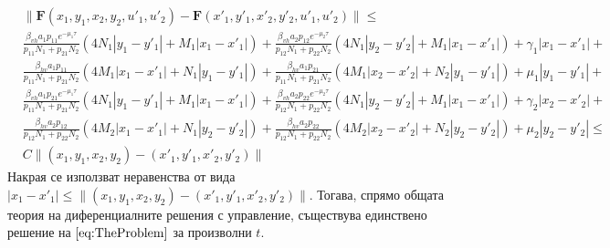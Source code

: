 \begin{align*}
  &\|\mathbf{F}(x_1, y_1, x_2, y_2, u'_1, u'_2) - \mathbf{F}(x'_1, y'_1, x'_2, y'_2, u'_1, u'_2)\| \leq \\
  &\frac{\beta_{vh} a_1 p_{11} e^{-\mu_1 \tau}}{p_{11} N_1 + p_{21} N_2} (4 N_1 |y_1 - y'_1| + M_1 |x_1 - x'_1|) +
  \frac{\beta_{vh} a_2 p_{12} e^{-\mu_2 \tau}}{p_{12} N_1 + p_{22} N_2}(4 N_1 |y_2 - y'_2| + M_1 |x_1 - x'_1|) + \gamma_1 |x_1-x'_1| + \\
  &\frac{\beta_{hv} a_1 p_{11}}{p_{11} N_1 + p_{21} N_2} (4 M_1 |x_1 - x'_1| + N_1 |y_1 - y'_1|) +
  \frac{\beta_{hv} a_1 p_{21}}{p_{11} N_1 + p_{21} N_2} (4 M_1 |x_2 - x'_2| + N_2 |y_1 - y'_1|) + \mu_1 |y_1 - y'_1| + \\
  &\frac{\beta_{vh} a_1 p_{21} e^{-\mu_1 \tau}}{p_{11} N_1 + p_{21} N_2} (4 N_1 |y_1 - y'_1| + M_1 |x_1 - x'_1|) +
  \frac{\beta_{vh} a_2 p_{22} e^{-\mu_2 \tau}}{p_{12} N_1 + p_{22} N_2}(4 N_1|y_2 - y'_2| + M_1 |x_1 - x'_1|) + \gamma_2 |x_2-x'_2| + \\
  &\frac{\beta_{hv} a_2 p_{12}}{p_{12} N_1 + p_{22} N_2} (4 M_2 |x_1 - x'_1| + N_1 |y_2 - y'_2|) +
  \frac{\beta_{hv} a_2 p_{22}}{p_{12} N_1 + p_{22} N_2} (4 M_2 |x_2 - x'_2| + N_2 |y_2 - y'_2|) + \mu_2 |y_2 - y'_2| \leq \\
  & C \|(x_1, y_1, x_2, y_2) - (x'_1, y'_1, x'_2, y'_2)\|
\end{align*}
Накрая се използват неравенства от вида $|x_1-x'_1| \leq \|(x_1, y_1, x_2, y_2) - (x'_1, y'_1, x'_2, y'_2)\|$. Тогава, спрямо общата теория на диференциалните решения с управление, съществува единствено решение на $\eqref{eq:TheProblem}$ за произволни $t$.

